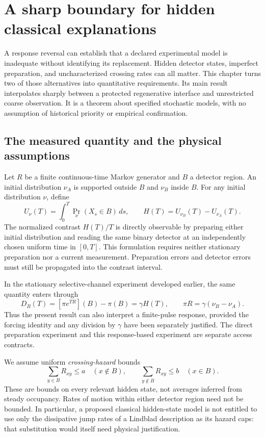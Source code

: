 \chapter{A sharp boundary for hidden classical explanations}
\label{rr:reset-boundary}

A response reversal can establish that a declared experimental model is
inadequate without identifying its replacement. Hidden detector states,
imperfect preparation, and uncharacterized crossing rates can all matter.
This chapter turns two of those alternatives into quantitative requirements.
Its main result interpolates sharply between a protected regenerative interface
and unrestricted coarse observation. It is a theorem about specified stochastic
models, with no assumption of historical priority or empirical confirmation.

\section{The measured quantity and the physical assumptions}

Let $R$ be a finite continuous-time Markov generator and $B$ a detector region.
An initial distribution $\nu_A$ is supported outside $B$ and $\nu_B$ inside $B$.
For any initial distribution $\nu$, define
\[
 U_\nu(T)=\int_0^T\Pr_\nu(X_s\in B)\,ds,
 \qquad H(T)=U_{\nu_B}(T)-U_{\nu_A}(T).
\]
The normalized contrast $H(T)/T$ is directly observable by preparing either
initial distribution and reading the same binary detector at an independently
chosen uniform time in $[0,T]$. This formulation requires neither stationary
preparation nor a current measurement. Preparation errors and detector errors
must still be propagated into the contrast interval.

In the stationary selective-channel experiment developed earlier, the same
quantity enters through
\[
 D_B(T)=[\pi e^{TR}](B)-\pi(B)=\gamma H(T),
 \qquad \pi R=\gamma(\nu_B-\nu_A).
\]
Thus the present result can also interpret a finite-pulse response, provided the
forcing identity and any division by $\gamma$ have been separately justified.
The direct preparation experiment and this response-based experiment are
separate access contracts.

We assume uniform \emph{crossing-hazard} bounds
\begin{equation}
 \sum_{y\in B}R_{xy}\leq a\quad(x\notin B),\qquad
 \sum_{y\notin B}R_{xy}\leq b\quad(x\in B).
 \label{rr:hazards}
\end{equation}
These are bounds on every relevant hidden state, not averages inferred from
steady occupancy. Rates of motion within either detector region need not be
bounded. In particular, a proposed classical hidden-state model is not entitled
to use only the dissipative jump rates of a Lindblad description as its hazard
caps: that substitution would itself need physical justification.

